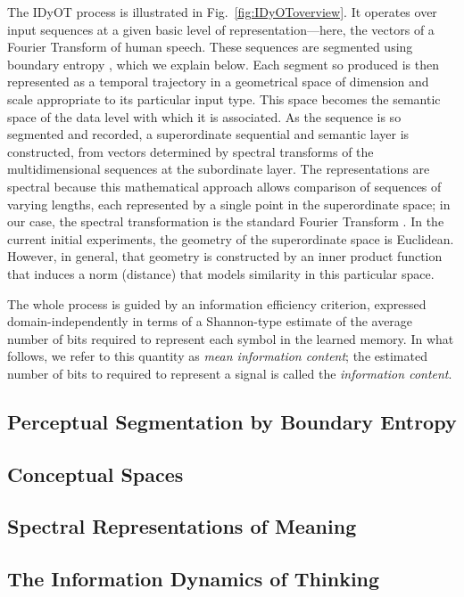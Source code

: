 \documentclass[runningheads]{llncs}
\begin{document}
The IDyOT process is illustrated in Fig.~\ref{fig:IDyOToverview}. It operates over 
input sequences at a given basic level of representation---here, the vectors of a Fourier Transform of human speech. These sequences are segmented using boundary entropy \cite{SproatShihEtAl94}, which we explain below. Each segment so produced is then represented as a temporal trajectory in a geometrical space of dimension and scale appropriate to its particular input type.  This space becomes the semantic space of the data level with which it is associated. As the sequence is so segmented and recorded, a superordinate sequential and semantic layer is constructed, from vectors determined by spectral transforms of the multidimensional sequences at the subordinate layer. The representations are spectral because this mathematical approach allows comparison of sequences of varying lengths, each represented by a single point in the superordinate space; in our case, the spectral transformation is the standard Fourier Transform \cite{?}. In the current initial experiments, the geometry of the superordinate space is Euclidean. However, in general, that geometry is constructed by an inner product function that induces a norm (distance) that models similarity in this particular space.

The whole process is guided by an information efficiency criterion, expressed domain-independently in terms of a Shannon-type estimate of the average number of bits required to represent each symbol in the learned memory. In what follows, we refer to this quantity as {\it mean information content}; the estimated number of bits to required to represent a signal is called the {\it information content}.

\subsection{Perceptual Segmentation by Boundary Entropy}
\subsection{Conceptual Spaces}
\cite{Gardenfors00,Gardenfors14}
\subsection{Spectral Representations of Meaning}
\cite[][\S7.2.5]{Wiggins18}
\subsection{The Information Dynamics of Thinking}
\end{document}
